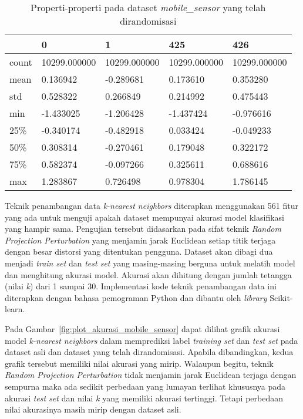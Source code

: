 \begin{table}
	\centering
	\caption{Properti-properti pada dataset \textit{mobile\_sensor} yang telah dirandomisasi}
	\begin{tabular}{l|llll}
		\hline
		& 0 & 1 & 425 & 426 \\ \hline
		count & 10299.000000 & 10299.000000 & 10299.000000 & 10299.000000 \\
		mean & 0.136942 & -0.289681 & 0.173610 & 0.353280 \\
		std & 0.528322 & 0.266849 & 0.214992 & 0.475443 \\
		min & -1.433025 & -1.206428 & -1.437424 & -0.976616 \\
		25\% & -0.340174 & -0.482918 & 0.033424 & -0.049233 \\
		50\% & 0.308314 & -0.270461 & 0.179048 & 0.322172 \\
		75\% & 0.582374 & -0.097266 & 0.325611 & 0.688616 \\
		max & 1.283867 & 0.726498 & 0.978304 & 1.786145 \\
		\hline
	\end{tabular}
	\label{table:properti-mobile-sensor-asli}
\end{table}
Teknik penambangan data \textit{k-nearest neighbors} diterapkan menggunakan 561 fitur yang ada untuk menguji apakah dataset mempunyai akurasi model klasifikasi yang hampir sama. Pengujian tersebut didasarkan pada sifat teknik \textit{Random Projection Perturbation} yang menjamin jarak Euclidean setiap titik terjaga dengan besar distorsi yang ditentukan pengguna. Dataset akan dibagi dua menjadi \textit{train set} dan \textit{test set} yang masing-masing berguna untuk melatih model dan menghitung akurasi model. Akurasi akan dihitung dengan jumlah tetangga (nilai \textit{k}) dari 1 sampai 30. Implementasi kode teknik penambangan data ini diterapkan dengan bahasa pemograman Python dan dibantu oleh \textit{library} Scikit-learn.

Pada Gambar~\ref{fig:plot_akurasi_mobile_sensor} dapat dilihat grafik akurasi model \textit{k-nearest neighbors} dalam memprediksi label \textit{training set} dan \textit{test set} pada dataset asli dan dataset yang telah dirandomisasi. Apabila dibandingkan, kedua grafik tersebut memiliki nilai akurasi yang mirip. Walaupun begitu, teknik \textit{Random Projection Perturbation} tidak menjamin jarak Euclidean terjaga dengan sempurna maka ada sedikit perbedaan yang lumayan terlihat khususnya pada akurasi \textit{test set} dan nilai \textit{k} yang memiliki akurasi tertinggi. Tetapi perbedaan nilai akurasinya masih mirip dengan dataset asli. 
	
